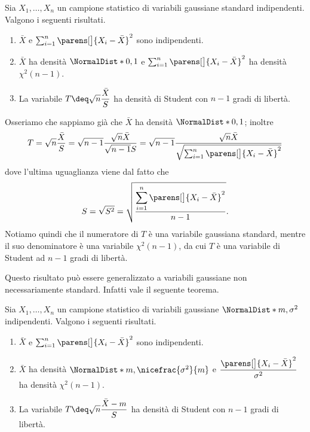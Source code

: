 \begin{theorem}\label{th:campione_gaussiano_standard}
    Sia $X_1, \dots, X_n$ un campione statistico di variabili gaussiane standard indipendenti. Valgono i seguenti risultati.
    \begin{enumerate}[label={(\roman*)}]
        \item $\bar X$ e $\sum_{i=1}^n\parens[\big]{X_i - \bar X}^2$ sono indipendenti.
        \item $\bar X$ ha densità $\NormalDist*{0, 1}$ e $\sum_{i=1}^n\parens[\big]{X_i - \bar X}^2$ ha densità $\chi^2(n-1)$.
        \item La variabile $T \deq \sqrt{n} \dfrac{\bar X}{S}$ ha densità di Student con $n-1$ gradi di libertà. 
    \end{enumerate}
\end{theorem}

Osseriamo che sappiamo già che $\bar X$ ha densità $\NormalDist*{0, 1}$; inoltre \[
    T = \sqrt{n} \dfrac{\bar X}{S} = \sqrt{n-1} \frac{\sqrt{n} \bar X}{\sqrt{n-1} S} = \sqrt{n-1} \frac{\sqrt{n} \bar X}{\sqrt{\sum_{i=1}^n \parens[\big]{X_i - \bar X}^2}}
\] dove l'ultima uguaglianza viene dal fatto che \[
    S = \sqrt{S^2} = \sqrt{\frac{\displaystyle \sum_{i=1}^n \parens[\big]{X_i - \bar X}^2}{n-1}}.
\] Notiamo quindi che il numeratore di $T$ è una variabile gaussiana standard, mentre il suo denominatore è una variabile $\chi^2(n-1)$, da cui $T$ è una variabile di Student ad $n-1$ gradi di libertà.

Questo risultato può essere generalizzato a variabili gaussiane non necessariamente standard. Infatti vale il seguente teorema.

\begin{theorem}\label{th:campione_gaussiano}
    Sia $X_1, \dots, X_n$ un campione statistico di variabili gaussiane $\NormalDist*{m, \sigma^2}$ indipendenti. Valgono i seguenti risultati.
    \begin{enumerate}[label={(\roman*)}]
        \item $\bar X$ e $\sum_{i=1}^n\parens[\big]{X_i - \bar X}^2$ sono indipendenti.
        \item $\bar X$ ha densità $\NormalDist*{m, \nicefrac{\sigma^2}{m}}$ e $\dfrac{\parens[\big]{X_i - \bar X}^2}{\sigma^2}$ ha densità $\chi^2(n-1)$.
        \item La variabile $T \deq \sqrt{n} \dfrac{\bar X - m}{S}$ ha densità di Student con $n-1$ gradi di libertà. 
    \end{enumerate}
\end{theorem}